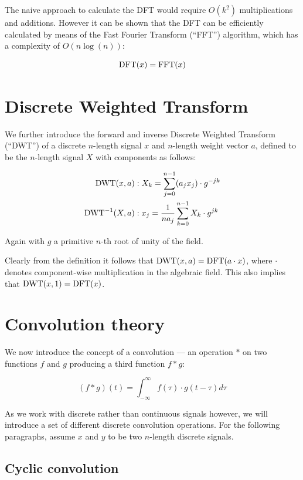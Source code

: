The naive approach to calculate the DFT would require $O(k^2)$ multiplications
and additions. However it can be shown that the DFT can be efficiently
calculated by means of the Fast Fourier Transform (``FFT'') algorithm, which
has a complexity of $O(n \log(n))$:\autocite{crandallPrimeNumbersComputational2005}

\[
		\operatorname{DFT}(x) = \operatorname{FFT}(x)
\]

\section{Discrete Weighted Transform}

We further introduce the forward and inverse Discrete Weighted Transform
(``DWT'') of a discrete $n$-length signal $x$ and $n$-length weight vector $a$,
defined to be the $n$-length signal $X$ with components as follows:

\begin{align*}
		\operatorname{DWT}(x, a) & : X_k = \sum_{j=0}^{n-1} (a_j x_j) \cdot g^{-jk} \\
		\operatorname{DWT}^{-1}(X, a) & : x_j = \frac{1}{n a_j} \sum_{k=0}^{n-1} X_k \cdot g^{jk}
\end{align*}

Again with $g$ a primitive $n$-th root of unity of the field.

Clearly from the definition it follows that $\operatorname{DWT}(x, a) = \operatorname{DFT}(a \cdot x)$,
where $\cdot$ denotes component-wise multiplication in the algebraic field.
This also implies that $\operatorname{DWT}(x, 1) = \operatorname{DFT}(x)$.

\section{Convolution theory}

We now introduce the concept of a convolution --- an operation $*$ on two
functions $f$ and $g$ producing a third function $f * g$:

\[
		(f * g)(t) = \int_{-\infty}^{\infty} f(\tau) \cdot g(t - \tau) d\tau
\]

As we work with discrete rather than continuous signals however, we will
introduce a set of different discrete convolution operations. For the following
paragraphs, assume $x$ and $y$ to be two $n$-length discrete signals.

\subsection{Cyclic convolution}

